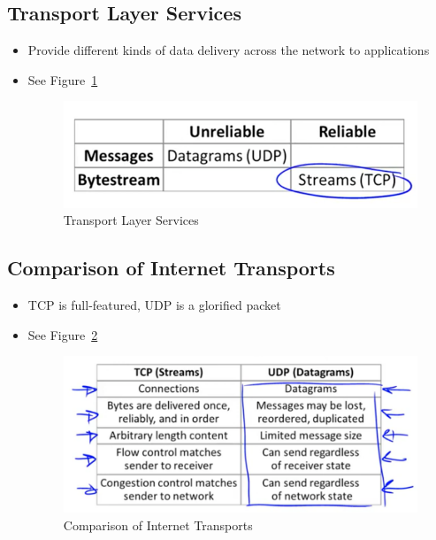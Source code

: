 \documentclass[12pt]{ctexart}   %
\begin{document}
	\subsection{Transport Layer Services}
	\begin{itemize}
		\item Provide different kinds of data delivery across the network to applications
		\item See Figure~\ref{fig:6-1-3}
		 
		 \begin{figure}[h!] %
		\centering
		 \includegraphics[scale=0.7]{images/6-1-3}
		\caption{ Transport Layer Services }
		 \label{fig:6-1-3}
		 \end{figure}
	\end{itemize}
	
	\subsection{Comparison of Internet Transports}
	\begin{itemize}
		\item TCP is full-featured, UDP is a glorified packet
		\item See Figure~\ref{fig:6-1-4}
		 
		 \begin{figure}[h!] %
		\centering
		 \includegraphics[scale=0.7]{images/6-1-4}
		\caption{ Comparison of Internet Transports }
		 \label{fig:6-1-4}
		 \end{figure}
	\end{itemize}
	
\end{document}
